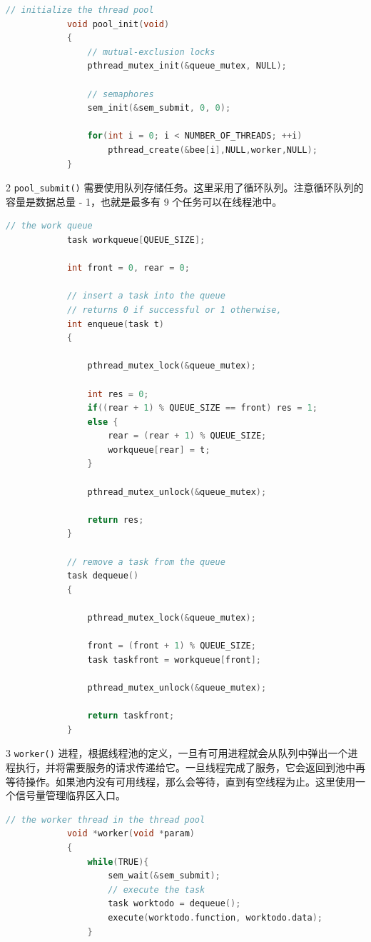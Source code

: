 \documentclass[12pt,a4paper]{article}
\newenvironment{problems}{\begin{list}{}{\renewcommand{\makelabel}[1]{\textbf{##1}\hfil}}}{\end{list}}
\newenvironment{steps}{\begin{list}{}{\renewcommand{\makelabel}[1]{##1.\hfil}}}{\end{list}}
\begin{document}
\begin{problems}
\begin{steps}
\begin{lstlisting}[language=c]
            // initialize the thread pool
            void pool_init(void)
            {
                // mutual-exclusion locks
                pthread_mutex_init(&queue_mutex, NULL);
            
                // semaphores
                sem_init(&sem_submit, 0, 0);
            
                for(int i = 0; i < NUMBER_OF_THREADS; ++i)
                    pthread_create(&bee[i],NULL,worker,NULL);
            }
        \end{lstlisting}
        \item[2] \verb"pool_submit()" 需要使用队列存储任务。这里采用了循环队列。注意循环队列的容量是数据总量 - 1，也就是最多有 9 个任务可以在线程池中。
        \begin{lstlisting}[language=c]
            // the work queue
            task workqueue[QUEUE_SIZE];

            int front = 0, rear = 0;

            // insert a task into the queue
            // returns 0 if successful or 1 otherwise, 
            int enqueue(task t) 
            {

                pthread_mutex_lock(&queue_mutex);

                int res = 0;
                if((rear + 1) % QUEUE_SIZE == front) res = 1;
                else {
                    rear = (rear + 1) % QUEUE_SIZE;
                    workqueue[rear] = t;
                }

                pthread_mutex_unlock(&queue_mutex);
                
                return res;
            }

            // remove a task from the queue
            task dequeue() 
            {

                pthread_mutex_lock(&queue_mutex);

                front = (front + 1) % QUEUE_SIZE;
                task taskfront = workqueue[front];

                pthread_mutex_unlock(&queue_mutex);

                return taskfront;
            }
        \end{lstlisting} 
        \item[3] \verb"worker()" 进程，根据线程池的定义，一旦有可用进程就会从队列中弹出一个进程执行，并将需要服务的请求传递给它。一旦线程完成了服务，它会返回到池中再等待操作。如果池内没有可用线程，那么会等待，直到有空线程为止。这里使用一个信号量管理临界区入口。
        \begin{lstlisting}[language=c]
            // the worker thread in the thread pool
            void *worker(void *param)
            {
                while(TRUE){
                    sem_wait(&sem_submit);
                    // execute the task
                    task worktodo = dequeue();
                    execute(worktodo.function, worktodo.data);
                }


\end{lstlisting}
\end{steps}
\end{problems}
\end{document}
